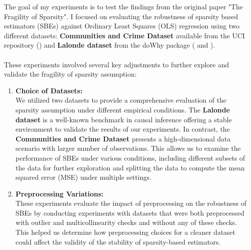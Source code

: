 The goal of my experiments is to test the findings from the original paper "The Fragility of Sparsity". I focused on evaluating the robustness of sparsity based estimators (SBEs) against Ordinary Least Squares (OLS) regression using two different datasets: \textbf{Communities and Crime Dataset} available from the UCI repository (\cite{misc_communities_and_crime_unnormalized_211}) and \textbf{Lalonde dataset} from the doWhy package (\cite{dowhy} and \cite{JMLR:v25:22-1258}). \\
\\
These experiments involved several key adjustments to further explore and validate the fragility of sparsity assumption:
\begin{enumerate}
    \item \textbf{Choice of Datasets:}\\
    We utilized two datasets to provide a comprehensive evaluation of the sparsity assumption under different empirical conditions. The \textbf{Lalonde dataset} is a well-known benchmark in causal inference offering a stable environment to validate the results of our experiments. In contrast, the \textbf{Communities and Crime Dataset} presents a high-dimensional data scenario with larger number of observations. This allows us to examine the performance of SBEs under various conditions, including different subsets of the data for further exploration and splitting the data to compute the mean squared error (MSE) under multiple settings. 

    \item \textbf{Preprocessing Variations:}\\
    These experiments evaluate the impact of preprocessing on the robustness of SBEs by conducting experiments with datasets that were both preprocessed with outlier and multicollinearity checks and without any of these checks. This helped us determine how preprocessing choices for a cleaner dataset could affect the validity of the stability of sparsity-based estimators. 


\end{enumerate}
